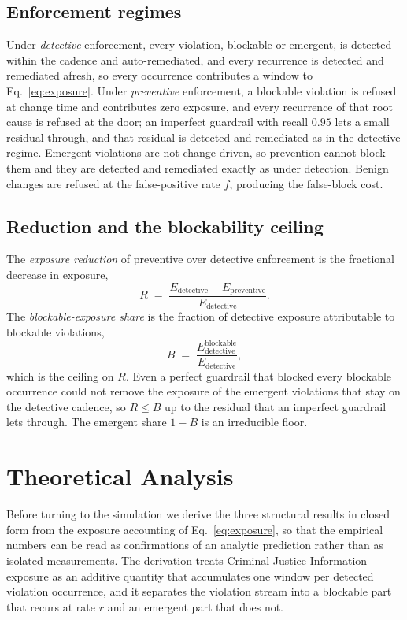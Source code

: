 \documentclass[journal]{IEEEtran}
\begin{document}
\subsection{Enforcement regimes}
Under \emph{detective} enforcement, every violation, blockable or emergent, is detected within the
cadence and auto-remediated, and every recurrence is detected and remediated afresh, so every
occurrence contributes a window to Eq.~\eqref{eq:exposure}. Under \emph{preventive} enforcement, a
blockable violation is refused at change time and contributes zero exposure, and every recurrence of
that root cause is refused at the door; an imperfect guardrail with recall $0.95$ lets a small
residual through, and that residual is detected and remediated as in the detective regime. Emergent
violations are not change-driven, so prevention cannot block them and they are detected and
remediated exactly as under detection. Benign changes are refused at the false-positive rate $f$,
producing the false-block cost.

\subsection{Reduction and the blockability ceiling}
The \emph{exposure reduction} of preventive over detective enforcement is the fractional decrease in
exposure,
\begin{equation}
R \;=\; \frac{E_{\text{detective}} - E_{\text{preventive}}}{E_{\text{detective}}}.
\label{eq:reduction}
\end{equation}
The \emph{blockable-exposure share} is the fraction of detective exposure attributable to blockable
violations,
\begin{equation}
B \;=\; \frac{E_{\text{detective}}^{\text{blockable}}}{E_{\text{detective}}},
\label{eq:ceiling}
\end{equation}
which is the ceiling on $R$. Even a perfect guardrail that blocked every blockable occurrence could
not remove the exposure of the emergent violations that stay on the detective cadence, so
$R \le B$ up to the residual that an imperfect guardrail lets through. The emergent share $1 - B$ is
an irreducible floor.

\section{Theoretical Analysis}
\label{sec:theory}
Before turning to the simulation we derive the three structural results in closed form from the
exposure accounting of Eq.~\eqref{eq:exposure}, so that the empirical numbers can be read as
confirmations of an analytic prediction rather than as isolated measurements. The derivation
treats Criminal Justice Information exposure as an additive quantity that accumulates one window
per detected violation occurrence, and it separates the violation stream into a blockable part that
recurs at rate $r$ and an emergent part that does not.
\end{document}
